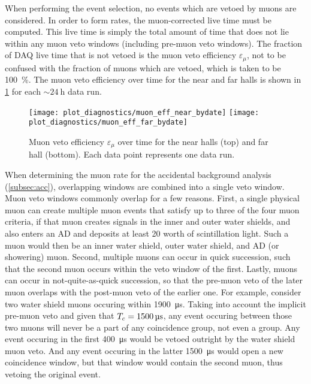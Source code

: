 When performing the event selection, no events which are vetoed by muons
are considered.
In order to form rates, the muon-corrected live time must be computed.
This live time is simply the total amount of time that
does not lie within any muon veto windows (including pre-muon veto windows).
The fraction of DAQ live time that is not vetoed
is the muon veto efficiency $\varepsilon_\mu$, not to be confused
with the fraction of muons which are vetoed,
which is taken to be \SI{100}{\percent}.
The muon veto efficiency over time for the near and far halls
is shown in \cref{fig:veto_eff} for each $\sim\SI{24}{\hour}$ data run.

\begin{figure}
    \texttt{[image: plot\_diagnostics/muon\_eff\_near\_bydate]}
    \texttt{[image: plot\_diagnostics/muon\_eff\_far\_bydate]}
    \caption{
        Muon veto efficiency $\varepsilon_\mu$ over time for
        the near halls (top) and far hall (bottom).
        Each data point represents one data run.
    }
    \label{fig:veto_eff}
\end{figure}

When determining the muon rate for the accidental background
analysis (\cref{subsec:acc}), overlapping windows are combined
into a single veto window.
Muon veto windows commonly overlap for a few reasons.
First, a single physical muon can create multiple muon events
that satisfy up to three of the four muon criteria,
if that muon creates signals in the inner and outer water shields,
and also enters an AD and deposits at least \SI{20}{\mev} worth of scintillation light.
Such a muon would then be an inner water shield, outer water shield, and AD
(or showering) muon.
Second, multiple muons can occur in quick succession,
such that the second muon occurs within the veto window of the first.
Lastly, muons can occur in not-quite-as-quick succession,
so that the pre-muon veto of the later muon overlaps with the
post-muon veto of the earlier one.
For example, consider two water shield muons occuring within \SI{1900}{\micro\second}.
Taking into account the implicit pre-muon veto
and given that $T_c=\SI{1500}{\micro\second}$,
any event occuring between those two muons will never be
a part of any coincidence group, not even a  group.
Any event occuring in the first \SI{400}{\micro\second} would be vetoed outright
by the water shield muon veto.
And any event occuring in the latter \SI{1500}{\micro\second} would open a new
coincidence window, but that window would contain the second muon,
thus vetoing the original event.

